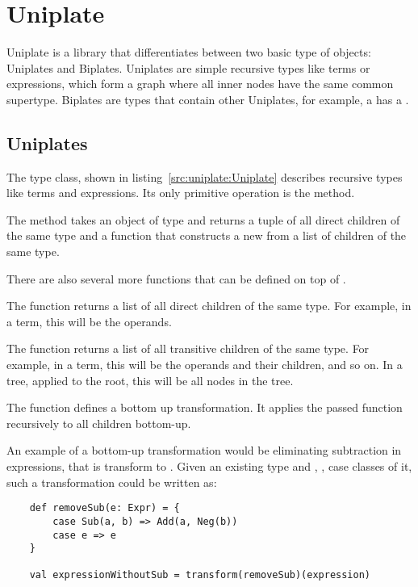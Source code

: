 \section{Uniplate}

Uniplate is a library that differentiates between two basic type of
objects: Uniplates and Biplates. Uniplates are simple recursive types
like terms or expressions, which form a graph where all inner nodes have
the same common supertype. Biplates are types that contain other Uniplates,
for example, a  has a .

\subsection{Uniplates}
The  type class, shown in listing~\ref{src:uniplate:Uniplate}
describes recursive types like terms and expressions. Its only primitive
operation is the  method.



The  method takes an object of type  and returns a tuple
of all direct children of the same type and a function that constructs a new 
from a list of children of the same type.


There are also several more functions that can be defined on top of .

The  function returns a list of all direct children of the same
type. For example, in a term, this will be the operands.

The  function returns a list of all transitive children of the
same type. For example, in a term, this will be the operands and their children,
and so on. In a tree, applied to the root, this will be all nodes in the tree.

The  function defines a bottom up transformation. It applies
the passed function recursively to all children bottom-up.

\begin{example}[Transformation]
An example of a bottom-up transformation would be eliminating subtraction in expressions, that
is transform  to . Given an existing type 
and , ,  case classes of it, such a transformation
could be written as:

\begin{lstlisting}
    def removeSub(e: Expr) = {
        case Sub(a, b) => Add(a, Neg(b))
        case e => e
    }

    val expressionWithoutSub = transform(removeSub)(expression)
\end{lstlisting}
\end{example}

